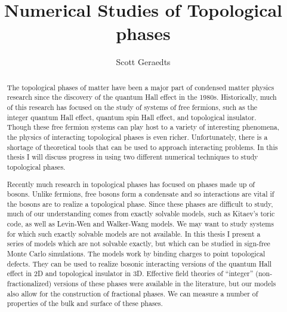 \documentclass{cit_thesis}
\begin{document}
\title{Numerical Studies of Topological phases}
\author{Scott Geraedts}


\begin{abstract}
The topological phases of matter have been a major part of condensed matter physics research since the discovery of the quantum Hall effect in the 1980s. Historically, much of this research has focused on the study of systems of free fermions, such as the integer quantum Hall effect, quantum spin Hall effect, and topological insulator. Though these free fermion systems can play host to a variety of interesting phenomena, the physics of interacting topological phases is even richer. Unfortunately, there is a shortage of theoretical tools that can be used to approach interacting problems. In this thesis I will discuss progress in using two different numerical techniques to study topological phases.

Recently much research in topological phases has focused on phases made up of bosons. Unlike fermions, free bosons form a condensate and so interactions are vital if the bosons are to realize a topological phase. Since these phases are difficult to study, much of our understanding comes from exactly solvable models, such as Kitaev's toric code, as well as Levin-Wen and Walker-Wang models. We may want to study systems for which such exactly solvable models are not available. In this thesis I present a series of models which are not solvable exactly, but which can be studied in sign-free Monte Carlo simulations. The models work by binding charges to point topological defects. They can be used to realize bosonic interacting versions of the quantum Hall effect in 2D and topological insulator in 3D. Effective field theories of ``integer'' (non-fractionalized) versions of these phases were available in the literature, but our models also allow for the construction of fractional phases. We can measure a number of properties of the bulk and surface of these phases. 


\end{abstract}
\end{document}
